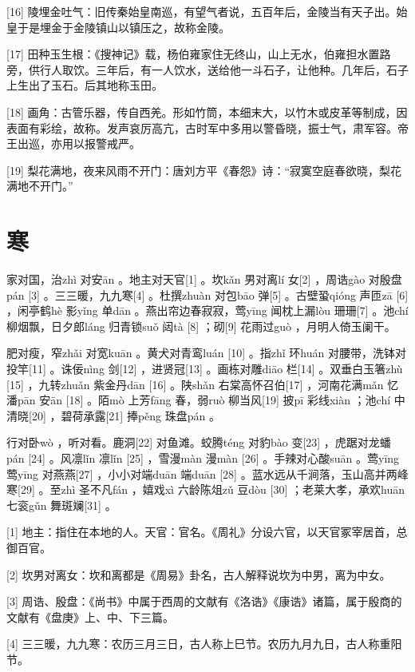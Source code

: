 \documentclass[12pt,UTF8]{ctexbook}
\begin{document}
[16] 陵埋金吐气：旧传秦始皇南巡，有望气者说，五百年后，金陵当有天子出。始皇于是埋金于金陵镇山以镇压之，故称金陵。

[17] 田种玉生根：《搜神记》载，杨伯雍家住无终山，山上无水，伯雍担水置路旁，供行人取饮。三年后，有一人饮水，送给他一斗石子，让他种。几年后，石子上生出了玉石。后其地称玉田。

[18] 画角：古管乐器，传自西羌。形如竹筒，本细末大，以竹木或皮革等制成，因表面有彩绘，故称。发声哀厉高亢，古时军中多用以警昏晓，振士气，肃军容。帝王出巡，亦用以报警戒严。

[19] 梨花满地，夜来风雨不开门：唐刘方平《春怨》诗：“寂寞空庭春欲晓，梨花满地不开门。”





\chapter{寒}


家对国，治zhì 对安ān 。地主对天官[1] 。坎kǎn 男对离lí 女[2] ，周诰gào 对殷盘pán [3] 。三三暖，九九寒[4] 。杜撰zhuàn 对包bāo 弹[5] 。古壁蛩qióng 声匝zā [6] ，闲亭鹤hè 影yǐng 单dān 。燕出帘边春寂寂，莺yīng 闻枕上漏lòu 珊珊[7] 。池chí 柳烟飘，日夕郎láng 归青锁suǒ 闼tà [8] ；砌[9] 花雨过guò ，月明人倚玉阑干。

肥对瘦，窄zhǎi 对宽kuān 。黄犬对青鸾luán [10] 。指zhǐ 环huán 对腰带，洗钵对投竿[11] 。诛佞nìng 剑[12] ，进贤冠[13] 。画栋对雕diāo 栏[14] 。双垂白玉箸zhù [15] ，九转zhuǎn 紫金丹dān [16] 。陕shǎn 右棠高怀召伯[17] ，河南花满mǎn 忆潘pān 安ān [18] 。陌mò 上芳fāng 春，弱ruò 柳当风[19] 披pī 彩线xiàn ；池chí 中清晓[20] ，碧荷承露[21] 捧pěng 珠盘pán 。

行对卧wò ，听对看。鹿洞[22] 对鱼滩。蛟腾téng 对豹bào 变[23] ，虎踞对龙蟠pán [24] 。风凛lǐn 凛lǐn [25] ，雪漫màn 漫màn [26] 。手辣对心酸suān 。莺yīng 莺yīng 对燕燕[27] ，小小对端duān 端duān [28] 。蓝水远从千涧落，玉山高并两峰寒[29] 。至zhì 圣不凡fán ，嬉戏xì 六龄陈俎zǔ 豆dòu [30] ；老莱大孝，承欢huān 七衮gǔn 舞斑斓[31] 。


[1] 地主：指住在本地的人。天官：官名。《周礼》分设六官，以天官冢宰居首，总御百官。

[2] 坎男对离女：坎和离都是《周易》卦名，古人解释说坎为中男，离为中女。

[3] 周诰、殷盘：《尚书》中属于西周的文献有《洛诰》《康诰》诸篇，属于殷商的文献有《盘庚》上、中、下三篇。

[4] 三三暖，九九寒：农历三月三日，古人称上巳节。农历九月九日，古人称重阳节。
\end{document}
